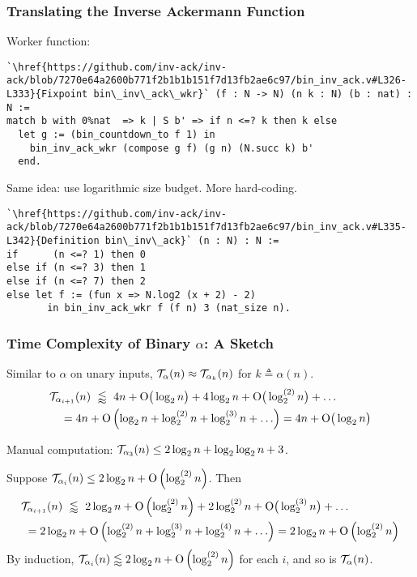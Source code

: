 \begin{frame}[fragile]
\frametitle{Translating the Inverse Ackermann Function}

Worker function:

\begin{lstlisting}
`\href{https://github.com/inv-ack/inv-ack/blob/7270e64a2600b771f2b1b1b151f7d13fb2ae6c97/bin_inv_ack.v#L326-L333}{Fixpoint bin\_inv\_ack\_wkr}` (f : N -> N) (n k : N) (b : nat) : N :=
match b with 0%nat  => k | S b' => if n <=? k then k else
  let g := (bin_countdown_to f 1) in
    bin_inv_ack_wkr (compose g f) (g n) (N.succ k) b'
  end.
\end{lstlisting}

\pause 
Same idea: use logarithmic size budget. More hard-coding.

\pause 
\begin{lstlisting}
`\href{https://github.com/inv-ack/inv-ack/blob/7270e64a2600b771f2b1b1b151f7d13fb2ae6c97/bin_inv_ack.v#L335-L342}{Definition bin\_inv\_ack}` (n : N) : N :=
if      (n <=? 1) then 0
else if (n <=? 3) then 1
else if (n <=? 7) then 2
else let f := (fun x => N.log2 (x + 2) - 2)
       in bin_inv_ack_wkr f (f n) 3 (nat_size n).
\end{lstlisting}

\end{frame}


\begin{frame}
\frametitle{Time Complexity of Binary $\alpha$: A Sketch}

Similar to $\alpha$ on unary inputs, $\mathcal{T}_{\alpha}(n) \approx \mathcal{T}_{\alpha_k}(n)$ for $k\triangleq \alpha(n)$.
\pause
\begin{equation*}
\begin{aligned}
& \mathcal{T}_{\alpha_{i+1}}(n) \ \lessapprox \ 4n + \text{O}\big(\log_2n\big) + 4\log_2n + \text{O}\big(\log_2^{(2)}n\big) + \ldots \\
& \quad = 4n + \text{O}\left(\log_2n + \log_2^{(2)}n + \log_2^{(3)}n + \ldots\right)
= 4n + \text{O}\big(\log_2n\big)
\end{aligned}
\end{equation*}

\smallskip

\pause
Manual computation: $\mathcal{T}_{\alpha_3}(n)\le 2\log_2n + \log_2\log_2n + 3$.

\smallskip

\pause
Suppose $\mathcal{T}_{\alpha_i}(n) \le 2\log_2n + \text{O}\left(\log_2^{(2)}n\right)$. \pause Then
\begin{equation*}
\begin{aligned}
& \mathcal{T}_{\alpha_{i+1}}(n) \ \lessapprox \ 2\log_2n + \text{O}\left(\log_2^{(2)}n\right) + 2\log_2^{(2)}n + \text{O}\big(\log_2^{(3)}n\big) + \ldots \\
& \ = 2\log_2n + \text{O}\left(\log_2^{(2)}n + \log_2^{(3)}n + \log_2^{(4)}n + \ldots\right)
= 2\log_2n + \text{O}\left(\log_2^{(2)}n\right)
\end{aligned}
\end{equation*}
\pause
By induction, $\mathcal{T}_{\alpha_i}(n) \lessapprox 2\log_2n + \text{O}\left(\log_2^{(2)}n\right)$ for each $i$, and so is $\mathcal{T}_{\alpha}(n)$.

\end{frame}
